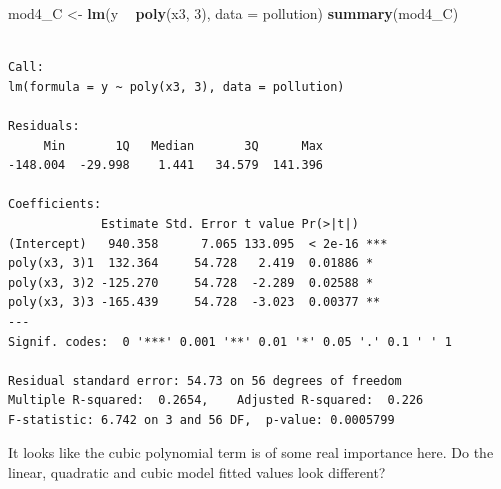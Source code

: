\documentclass[]{book}
\newenvironment{Shaded}{\begin{snugshade}}{\end{snugshade}}
\newcommand{\KeywordTok}[1]{\textcolor[rgb]{0.13,0.29,0.53}{\textbf{#1}}}
\newcommand{\DataTypeTok}[1]{\textcolor[rgb]{0.13,0.29,0.53}{#1}}
\newcommand{\DecValTok}[1]{\textcolor[rgb]{0.00,0.00,0.81}{#1}}
\newcommand{\StringTok}[1]{\textcolor[rgb]{0.31,0.60,0.02}{#1}}
\newcommand{\OperatorTok}[1]{\textcolor[rgb]{0.81,0.36,0.00}{\textbf{#1}}}
\newcommand{\NormalTok}[1]{#1}
\theoremstyle{definition}
\theoremstyle{definition}
\theoremstyle{definition}
\theoremstyle{remark}
\begin{document}
\begin{Shaded}
\begin{Highlighting}[]
\NormalTok{mod4_C <-}\StringTok{ }\KeywordTok{lm}\NormalTok{(y }\OperatorTok{~}\StringTok{ }\KeywordTok{poly}\NormalTok{(x3, }\DecValTok{3}\NormalTok{), }\DataTypeTok{data =}\NormalTok{ pollution)}
\KeywordTok{summary}\NormalTok{(mod4_C)}
\end{Highlighting}
\end{Shaded}

\begin{verbatim}

Call:
lm(formula = y ~ poly(x3, 3), data = pollution)

Residuals:
     Min       1Q   Median       3Q      Max 
-148.004  -29.998    1.441   34.579  141.396 

Coefficients:
             Estimate Std. Error t value Pr(>|t|)    
(Intercept)   940.358      7.065 133.095  < 2e-16 ***
poly(x3, 3)1  132.364     54.728   2.419  0.01886 *  
poly(x3, 3)2 -125.270     54.728  -2.289  0.02588 *  
poly(x3, 3)3 -165.439     54.728  -3.023  0.00377 ** 
---
Signif. codes:  0 '***' 0.001 '**' 0.01 '*' 0.05 '.' 0.1 ' ' 1

Residual standard error: 54.73 on 56 degrees of freedom
Multiple R-squared:  0.2654,    Adjusted R-squared:  0.226 
F-statistic: 6.742 on 3 and 56 DF,  p-value: 0.0005799
\end{verbatim}

It looks like the cubic polynomial term is of some real importance here.
Do the linear, quadratic and cubic model fitted values look different?
\end{document}
